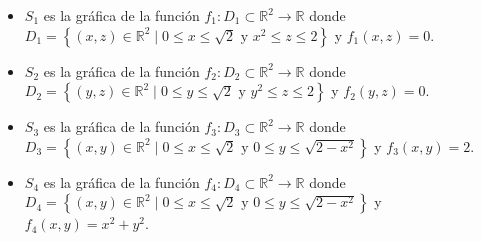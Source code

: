\documentclass[fleqn]{article}
\begin{document}
    \begin{itemize}
        \item $ S_1 $ es la gráfica de la función $ f_1 : D_1 \subset \mathbb{R}^2 \to \mathbb{R} $ donde $ D_1 = \left\lbrace (x,z) \in \mathbb{R}^2 \; \big| \; 0 \leq x \leq \sqrt{2} \text{ y } x^2 \leq z \leq 2 \right\rbrace $ y $ f_1(x,z) = 0 $.

        \item $ S_2 $ es la gráfica de la función $ f_2 : D_2 \subset \mathbb{R}^2 \to \mathbb{R} $ donde $ D_2 = \left\lbrace (y,z) \in \mathbb{R}^2 \; \big| \; 0 \leq y \leq \sqrt{2} \text{ y } y^2 \leq z \leq 2 \right\rbrace $ y $ f_2(y,z) = 0 $.

        \item $ S_3 $ es la gráfica de la función $ f_3 : D_3 \subset \mathbb{R}^2 \to \mathbb{R} $ donde $ D_3 = \left\lbrace (x,y) \in \mathbb{R}^2 \; \big| \; 0 \leq x \leq \sqrt{2} \text{ y } 0 \leq y \leq \sqrt{2 - x^2} \right\rbrace $ y $ f_3(x,y) = 2 $.

        \item $ S_4 $ es la gráfica de la función $ f_4 : D_4 \subset \mathbb{R}^2 \to \mathbb{R} $ donde $ D_4 = \left\lbrace (x,y) \in \mathbb{R}^2 \; \big| \; 0 \leq x \leq \sqrt{2} \text{ y } 0 \leq y \leq \sqrt{2 - x^2} \right\rbrace $ y $ f_4(x,y) = x^2 + y^2 $.


\end{itemize}
\end{document}
